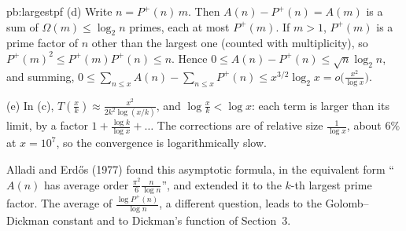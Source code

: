 \begin{solution}{pb:largestpf}
(d) Write $n=P^+(n)\,m$. Then $A(n)-P^+(n)=A(m)$ is a sum of $\Omega(m)\le\log_2n$ primes, each at most $P^+(m)$. If $m>1$, $P^+(m)$ is a prime factor of $n$ other than the
largest one (counted with multiplicity), so $P^+(m)^2\le P^+(m)P^+(n)\le n$. Hence $0\le A(n)-P^+(n)\le\sqrt n\log_2n$, and summing,
$0\le\sum_{n\le x}A(n)-\sum_{n\le x}P^+(n)\le x^{3/2}\log_2x=o\bigl(\frac{x^2}{\log x}\bigr)$.

(e) In (c), $T(\frac xk)\approx\frac{x^2}{2k^2\log(x/k)}$, and $\log\frac xk<\log x$: each term is larger than its limit, by a factor $1+\frac{\log k}{\log x}+\dots$ The
corrections are of relative size $\frac1{\log x}$, about $6\%$ at $x=10^7$, so the convergence is logarithmically slow.

\leads Alladi and Erd\H os (1977) found this asymptotic formula, in the equivalent form ``$A(n)$ has average order $\frac{\pi^2}6\frac n{\log n}$'', and extended it to the $k$-th largest prime
factor. The average of $\frac{\log P^+(n)}{\log n}$, a different question, leads to the Golomb--Dickman constant and to Dickman's function of Section~3.
\end{solution}

